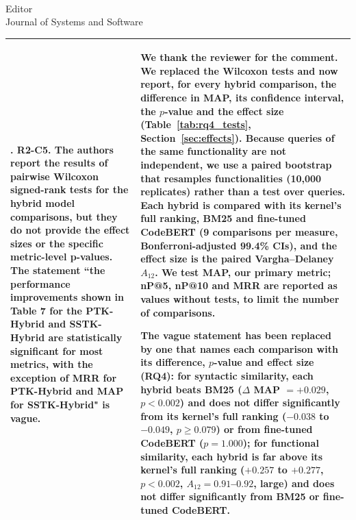 \documentclass[
pagenumber=false, %
parskip=half, %
fromalign=right, %
foldmarks=false, %
addrfield=false %
]{scrlttr2}
\newcounter{commentcounter} %
\newcommand{\comment}[1]{\refstepcounter{commentcounter}\thecommentcounter.} %
\begin{document}
\begin{letter}{\\Editor\\Journal of Systems and Software}
\begin{longtable}{p{}p{}}
		\comment{2} \textbf{R2-C5.} The authors report the results of pairwise Wilcoxon signed-rank tests for the hybrid model comparisons, but they do not provide the effect sizes or the specific metric-level p-values. The statement ``the performance improvements shown in Table 7 for the PTK-Hybrid and SSTK-Hybrid are statistically significant for most metrics, with the exception of MRR for PTK-Hybrid and MAP for SSTK-Hybrid" is vague. & 
		We thank the reviewer for the comment. We replaced the Wilcoxon tests and now report, for every hybrid comparison,
		the difference in MAP, its confidence interval, the $p$-value and the effect size
		(Table~\ref{tab:rq4_tests}, Section~\ref{sec:effects}). Because queries of the same functionality
		are not independent, we use a paired bootstrap that resamples functionalities (10,000 replicates)
		rather than a test over queries. Each hybrid is compared with its kernel's full ranking, BM25 and
		fine-tuned CodeBERT (9 comparisons per measure, Bonferroni-adjusted 99.4\% CIs), and the effect size
		is the paired Vargha--Delaney $A_{12}$. We test MAP, our primary metric; nP@5, nP@10 and MRR are
		reported as values without tests, to limit the number of comparisons. 
		
		The vague statement has been
		replaced by one that names each comparison with its difference, $p$-value and effect size (RQ4):
		for syntactic similarity, each hybrid beats BM25 ($\Delta$ MAP $= +0.029$, $p < 0.002$) and does not
		differ significantly from its kernel's full ranking ($-0.038$ to $-0.049$, $p \geq 0.079$) or from
		fine-tuned CodeBERT ($p = 1.000$); for functional similarity, each hybrid is far above its kernel's
		full ranking ($+0.257$ to $+0.277$, $p < 0.002$, $A_{12} = 0.91$--$0.92$, large) and does not differ
		significantly from BM25 or fine-tuned CodeBERT.
		
		
		\\ \midrule
			

\end{longtable}
\end{letter}
\end{document}
